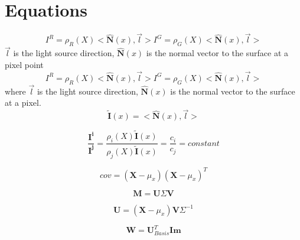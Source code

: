\documentclass{article}\twocolumn
\begin{document}
\section{Equations} 
\begin{equation}
    I^{R} = \rho _{R}(X)<\hat{\mathbf{N}}(x),\vec{l}>
    I^{G} = \rho _{G}(X)<\hat{\mathbf{N}}(x),\vec{l}>
\end{equation}
$\vec{l}$ is the light source direction, $\hat{\mathbf{N}}(x)$ is the normal vector to the surface at a pixel point
\begin{equation}
    I^{R} = \rho _{R}(X)<\hat{\mathbf{N}}(x),\vec{l}> \label{eqn:surface}
    I^{G} = \rho _{G}(X)<\hat{\mathbf{N}}(x),\vec{l}>
\end{equation}
where $\vec{l}$ is the light source direction, $\hat{\mathbf{N}}(x)$ is the normal vector to the surface at a pixel.
\begin{equation}
    \tilde{\mathbf{I}}(x) = <\hat{\mathbf{N}}(x),\vec{l}>
\end{equation}

\begin{equation}
    \frac{\mathbf{I^{i}}}{\mathbf{I^{j}}} = \frac{\rho _{i}(X)\tilde{\mathbf{I}}(x)}{\rho _{j}(X)\tilde{\mathbf{I}}(x)} = \frac{c_{i}}{c_{j}} = constant
\end{equation}

\begin{equation}
    cov = (\textbf{X} - \mu_{x})(\textbf{X} - \mu_{x})^{T}
\end{equation}

\begin{equation}
    \textbf{M} = \textbf{U} \textbf{$\Sigma$} \textbf{V}
\end{equation}

\begin{equation}
    \textbf{U} = (\textbf{X} - \mu_{x}) \textbf{V} \Sigma^{-1}
\end{equation}

\begin{equation}
    \textbf{W} = \textbf{U}_{Basis}^{T} \textbf{Im}
\end{equation}




\end{document}
